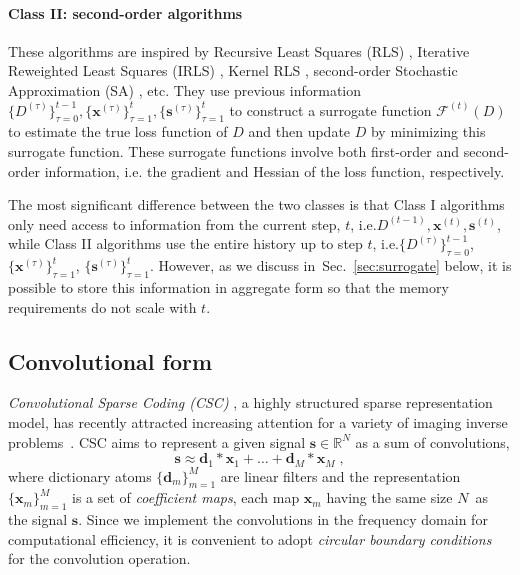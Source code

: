 \documentclass[final]{siamart1116}
\newcommand{\ie}{i.e.\xspace}
\newcommand{\sctn}[1]{Sec.~\ref{sec:#1}}
\newcommand{\mb}[1]{\mathbf{#1}}
\def \R  {\mathbb{R}}
\def \F  {\mathcal{F}}
\begin{document}
\paragraph{Class II: second-order algorithms}
These algorithms are inspired by Recursive Least Squares (RLS) \cite{skretting-2010-recursive, eksioglu2014online}, Iterative Reweighted Least Squares (IRLS) \cite{lu2013online, wang2013online}, Kernel RLS \cite{gao2014online}, second-order Stochastic Approximation (SA) \cite{mairal2009online, szabo2011online, zhang2012online, slavakis2014online, zhang2015online, kasiviswanathan2012online}, etc. They use previous information $\{D^{(\tau)}\}_{\tau=0}^{t-1}, \{\mb{x}^{(\tau)}\}_{\tau=1}^{t}, \{\mb{s}^{(\tau)}\}_{\tau=1}^{t}$ to construct a surrogate function $\F^{(t)}(D)$ to estimate the true loss function of $D$ and then update $D$ by minimizing this surrogate function. These surrogate functions involve both first-order and second-order information, i.e. the gradient and Hessian of the loss function, respectively.

The most significant difference between the two classes is that Class I algorithms only need access to information from the current step, $t$, \ie $D^{(t-1)}, \mb{x}^{(t)},\mb{s}^{(t)}$, while Class II algorithms use the entire history up to step $t$, \ie $\{D^{(\tau)}\}_{\tau=0}^{t-1}$, $\{\mb{x}^{(\tau)}\}_{\tau=1}^{t}$, $\{\mb{s}^{(\tau)}\}_{\tau=1}^{t}$. However, as we discuss in~\sctn{surrogate} below, it is possible to store this information in aggregate form so that the memory requirements do not scale with $t$.



\subsection{Convolutional form}

\emph{Convolutional Sparse Coding (CSC)} \cite{lewicki-1999-coding, zeiler-2010-deconvolutional} \cite[Sec. II]{wohlberg-2016-efficient}, a highly structured sparse representation model, has recently attracted increasing attention for a variety of imaging inverse problems~\cite{gu-2015-convolutional, liu-2016-image, zhang-2016-convolutional, quan-2016-compressed, wohlberg-2016-convolutional2, zhang-2017-convolutional}. CSC aims to represent a given signal $\mb{s}\in\R^N$ as a sum of convolutions,
\begin{equation}
\label{eqn:csc}
\mb{s} \approx \mb{d}_1 \ast \mb{x}_1 + \ldots + \mb{d}_M \ast \mb{x}_M \;,
\end{equation}
where dictionary atoms $\{\mb{d}_m\}_{m=1}^M$ are linear filters and the representation $\{\mb{x}_m\}_{m=1}^M$ is a set of \emph{coefficient maps}, each map $\mb{x}_m$ having the same size $N$\ as the signal $\mb{s}$.  Since we implement the convolutions in the frequency domain for computational efficiency, it is convenient to adopt \emph{circular boundary conditions} for the convolution operation.
\end{document}
